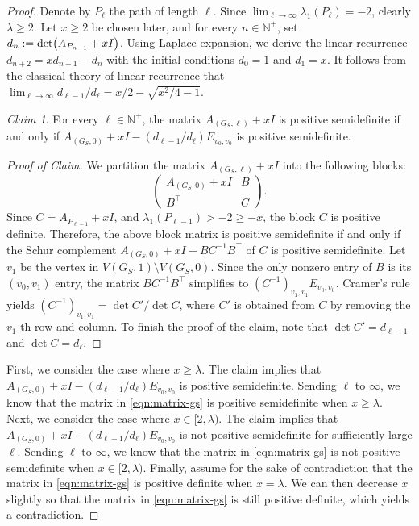 \documentclass[11pt]{article}
\theoremstyle{definition}
\theoremstyle{remark}
\newtheorem*{claim*}{Claim}
\newenvironment{claimproof}[1][Proof]{\begin{proof}[#1]\renewcommand*{\qedsymbol}{\(\diamondsuit\)}}{\end{proof}}
\newcommand{\la}{\lambda}
\newcommand{\N}{\mathbb{N}}
\newcommand{\T}{\intercal}
\begin{document}
\begin{proof}
    Denote by $P_\ell$ the path of length $\ell$. Since $\lim_{\ell \to \infty}\la_1(P_\ell) = -2$, clearly $\la \ge 2$. Let $x \ge 2$ be chosen later, and for every $n \in \N^+$, set $d_n := \det\mleft(A_{P_{n-1}} + xI\mright)$. Using Laplace expansion, we derive the linear recurrence $d_{n+2} = x d_{n+1} - d_n$ with the initial conditions $d_0 = 1$ and $d_1 = x$. It follows from the classical theory of linear recurrence that $\lim_{\ell \to \infty} d_{\ell-1}/d_\ell = x/2 - \sqrt{x^2/4-1}$.

    \begin{claim*}
        For every $\ell \in \N^+$, the matrix $A_{(G_S, \ell)} + x I$ is positive semidefinite if and only if $A_{(G_S, 0)} + xI - (d_{\ell-1}/d_\ell)E_{v_0,v_0}$ is positive semidefinite.
    \end{claim*}

    \begin{claimproof}[Proof of Claim]
        We partition the matrix $A_{(G_S,\ell)} + xI$ into the following blocks:
        \[
            \begin{pmatrix}
                A_{(G_S,0)} + xI & B \\
                B^\T & C
            \end{pmatrix}.
        \]
        Since $C = A_{P_{\ell-1}} + xI$, and $\la_1(P_{\ell-1}) > -2 \ge -x$, the block $C$ is positive definite. Therefore, the above block matrix is positive semidefinite if and only if the Schur complement $A_{(G_S, 0)} + xI - BC^{-1}B^\T$ of $C$ is positive semidefinite. Let $v_1$ be the vertex in $V(G_S, 1) \setminus V(G_S, 0)$. Since the only nonzero entry of $B$ is its $(v_0, v_1)$ entry, the matrix $BC^{-1}B^\T$ simplifies to $(C^{-1})_{v_1, v_1}E_{v_0,v_0}$. Cramer's rule yields $(C^{-1})_{v_1,v_1}=\det C' / \det C$, where $C'$ is obtained from $C$ by removing the $v_1$-th row and column. To finish the proof of the claim, note that $\det C' = d_{\ell-1}$ and $\det C = d_\ell$.
    \end{claimproof}

    First, we consider the case where $x \ge \la$. The claim implies that $A_{(G_S,0)} + xI - (d_{\ell-1}/d_\ell)E_{v_0,v_0}$ is positive semidefinite. Sending $\ell$ to $\infty$, we know that the matrix in \eqref{eqn:matrix-gs} is positive semidefinite when $x \ge \la$. Next, we consider the case where $x \in [2, \la)$. The claim implies that $A_{(G_S,0)} + xI - (d_{\ell-1}/d_\ell)E_{v_0,v_0}$ is not positive semidefinite for sufficiently large $\ell$. Sending $\ell$ to $\infty$, we know that the matrix in \eqref{eqn:matrix-gs} is not positive semidefinite when $x \in [2, \la)$. Finally, assume for the sake of contradiction that the matrix in \eqref{eqn:matrix-gs} is positive definite when $x = \la$. We can then decrease $x$ slightly so that the matrix in \eqref{eqn:matrix-gs} is still positive definite, which yields a contradiction.
\end{proof}
\end{document}
